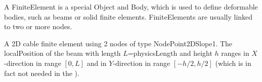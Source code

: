\ei

%

\newpage
A FiniteElement is a special Object and Body, which is used to define deformable bodies, such as beams or solid finite elements. FiniteElements are usually linked to two or more nodes.


\label{sec:item:ObjectANCFCable2D}
A 2D cable finite element using 2 nodes of type NodePoint2DSlope1. The localPosition of the beam with length $L$=physicsLength and height $h$ ranges in $X$-direction in range $[0, L]$ and in $Y$-direction in range $[-h/2,h/2]$ (which is in fact not needed in the ).
\vspace{12pt}\\

